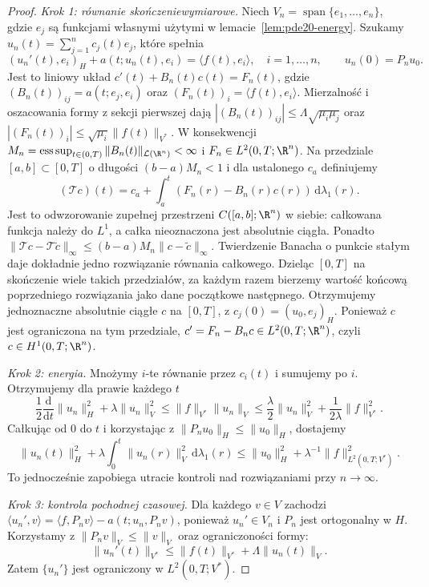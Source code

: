\begin{proof}
\emph{Krok 1: równanie skończeniewymiarowe.}
Niech $V_n=\operatorname{span}\{e_1,\ldots,e_n\}$, gdzie $e_j$ są
funkcjami własnymi użytymi w lemacie~\ref{lem:pde20-energy}.
Szukamy $u_n(t)=\sum_{j=1}^n c_j(t)e_j$, które spełnia
\[
 (u_n'(t),e_i)_H+a(t;u_n(t),e_i)
 =\langle f(t),e_i\rangle,\quad i=1,\ldots,n,
 \qquad u_n(0)=P_nu_0.
\]
Jest to liniowy układ $c'(t)+B_n(t)c(t)=F_n(t)$,
gdzie $(B_n(t))_{ij}=a(t;e_j,e_i)$ oraz
$(F_n(t))_i=\langle f(t),e_i\rangle$.
Mierzalność i oszacowania formy z sekcji pierwszej dają
$|(B_n(t))_{ij}|\le\Lambda\sqrt{\mu_i\mu_j}$ oraz
$|(F_n(t))_i|\le\sqrt{\mu_i}\|f(t)\|_{V^*}$.
W konsekwencji $M_n=\operatorname*{ess\,sup}_{t\in(0,T)}
\|B_n(t)\|_{\mathcal L(\R^n)}<\infty$ i
$F_n\in L^2(0,T;\R^n)$.
Na przedziale $[a,b]\subset[0,T]$ o długości
$(b-a)M_n<1$ i dla ustalonego $c_a$ definiujemy
\[
 (\mathcal Tc)(t)=c_a+\int_a^t
 (F_n(r)-B_n(r)c(r))\,\mathrm d\lambda_1(r).
\]
Jest to odwzorowanie zupełnej przestrzeni
$C([a,b];\R^n)$ w siebie: całkowana funkcja należy
do $L^1$, a całka nieoznaczona jest absolutnie ciągła.
Ponadto $\|\mathcal Tc-\mathcal T\widetilde c\|_\infty
\le(b-a)M_n\|c-\widetilde c\|_\infty$.
Twierdzenie Banacha o punkcie stałym daje dokładnie
jedno rozwiązanie równania całkowego.
Dzieląc $[0,T]$ na skończenie wiele takich przedziałów,
za każdym razem bierzemy wartość końcową poprzedniego
rozwiązania jako dane początkowe następnego.
Otrzymujemy jednoznaczne absolutnie ciągłe $c$
na $[0,T]$, z $c_j(0)=(u_0,e_j)_H$.
Ponieważ $c$ jest ograniczona na tym przedziale,
$c'=F_n-B_nc\in L^2(0,T;\R^n)$, czyli $c\in H^1(0,T;\R^n)$.

\emph{Krok 2: energia.}
Mnożymy $i$-te równanie przez $c_i(t)$ i sumujemy po $i$.
Otrzymujemy dla prawie każdego $t$
\[
 \frac12\frac{\mathrm d}{\mathrm dt}\|u_n\|_H^2
 +\lambda\|u_n\|_V^2
 \le\|f\|_{V^*}\|u_n\|_V
 \le\frac{\lambda}{2}\|u_n\|_V^2
 +\frac1{2\lambda}\|f\|_{V^*}^2.
\]
Całkując od $0$ do $t$ i korzystając z
$\|P_nu_0\|_H\le\|u_0\|_H$, dostajemy
\begin{equation}\label{eq:pde20-energy-n}
 \|u_n(t)\|_H^2+\lambda\int_0^t\|u_n(r)\|_V^2\,\mathrm d\lambda_1(r)
 \le\|u_0\|_H^2+\lambda^{-1}\|f\|_{L^2(0,T;V^*)}^2.
\end{equation}
To jednocześnie zapobiega utracie kontroli nad rozwiązaniami przy $n\to\infty$.

\emph{Krok 3: kontrola pochodnej czasowej.}
Dla każdego $v\in V$ zachodzi
$\langle u_n',v\rangle=\langle f,P_nv\rangle-a(t;u_n,P_nv)$,
ponieważ $u_n'\in V_n$ i $P_n$ jest ortogonalny w $H$.
Korzystamy z $\|P_nv\|_V\le\|v\|_V$ oraz ograniczoności formy:
\[
 \|u_n'(t)\|_{V^*}\le\|f(t)\|_{V^*}+\Lambda\|u_n(t)\|_V.
\]
Zatem $\{u_n'\}$ jest ograniczony w $L^2(0,T;V^*)$.


\end{proof}
